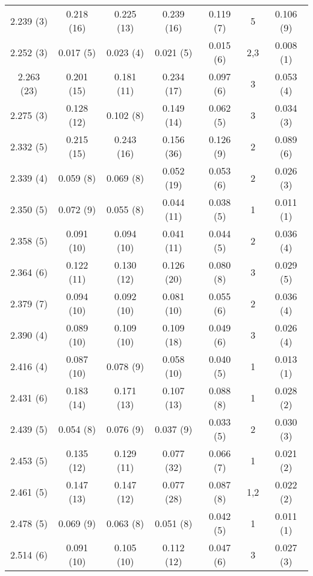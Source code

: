 \begin{table}
\begin{tabular}{c c c c c c c}
2.239 (3) & 0.218 (16) & 0.225 (13) & 0.239 (16) & 0.119 (7) & 5 & 0.106 (9) \\
2.252 (3) & 0.017 (5) & 0.023 (4) & 0.021 (5) & 0.015 (6) & 2,3 & 0.008 (1) \\
2.263 (23) & 0.201 (15) & 0.181 (11) & 0.234 (17) & 0.097 (6) & 3 & 0.053 (4) \\
2.275 (3) & 0.128 (12) & 0.102 (8) & 0.149 (14) & 0.062 (5) & 3 & 0.034 (3) \\
2.332 (5) & 0.215 (15) & 0.243 (16) & 0.156 (36) & 0.126 (9) & 2 & 0.089 (6) \\
2.339 (4) & 0.059 (8) & 0.069 (8) & 0.052 (19) & 0.053 (6) & 2 & 0.026 (3) \\
2.350 (5) & 0.072 (9) & 0.055 (8) & 0.044 (11) & 0.038 (5) & 1 & 0.011 (1) \\
2.358 (5) & 0.091 (10) & 0.094 (10) & 0.041 (11) & 0.044 (5) & 2 & 0.036 (4) \\
2.364 (6) & 0.122 (11) & 0.130 (12) & 0.126 (20) & 0.080 (8) & 3 & 0.029 (5) \\
2.379 (7) & 0.094 (10) & 0.092 (10) & 0.081 (10) & 0.055 (6) & 2 & 0.036 (4) \\
2.390 (4) & 0.089 (10) & 0.109 (10) & 0.109 (18) & 0.049 (6) & 3 & 0.026 (4) \\
2.416 (4) & 0.087 (10) & 0.078 (9) & 0.058 (10) & 0.040 (5) & 1 & 0.013 (1) \\
2.431 (6) & 0.183 (14) & 0.171 (13) & 0.107 (13) & 0.088 (8) & 1 & 0.028 (2) \\
2.439 (5) & 0.054 (8) & 0.076 (9) & 0.037 (9) & 0.033 (5) & 2 & 0.030 (3) \\
2.453 (5) & 0.135 (12) & 0.129 (11) & 0.077 (32) & 0.066 (7) & 1 & 0.021 (2) \\
2.461 (5) & 0.147 (13) & 0.147 (12) & 0.077 (28) & 0.087 (8) & 1,2 & 0.022 (2) \\
2.478 (5) & 0.069 (9) & 0.063 (8) & 0.051 (8) & 0.042 (5) & 1 & 0.011 (1) \\
2.514 (6) & 0.091 (10) & 0.105 (10) & 0.112 (12) & 0.047 (6) & 3 & 0.027 (3) \\
\hline \hline
\end{tabular}
\label{Sm2}
\end{table}